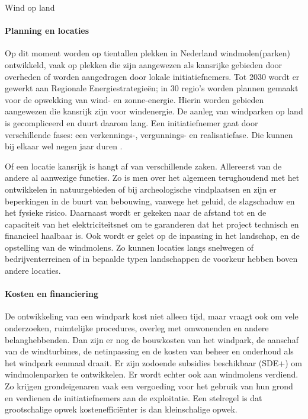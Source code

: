 \begin{voorstel}{Wind op land}
\begin{multicols}{2}
\begin{overwegingen}
\paragraph{Planning en locaties}
Op dit moment worden op tientallen plekken in Nederland windmolen(parken) ontwikkeld, vaak op plekken die zijn aangewezen als kansrijke gebieden door overheden of worden aangedragen door lokale initiatiefnemers. Tot 2030 wordt er gewerkt aan Regionale Energiestrategieën; in 30 regio’s worden plannen gemaakt voor de opwekking van wind- en zonne-energie. Hierin worden gebieden aangewezen die kansrijk zijn voor windenergie. De aanleg van windparken op land is gecompliceerd en duurt daarom lang. Een initiatiefnemer gaat door verschillende fases: een verkennings-, vergunnings- en realisatiefase. Die kunnen bij elkaar wel negen jaar duren \parencite{rijksdienst_voor_ondernemend_nederland_windenergie_nodate}.

Of een locatie kansrijk is hangt af van verschillende zaken. Allereerst van de andere al aanwezige functies. Zo is men over het algemeen terughoudend met het ontwikkelen in natuurgebieden of bij archeologische vindplaatsen en zijn er beperkingen in de buurt van bebouwing, vanwege het geluid, de slagschaduw en het fysieke risico. Daarnaast wordt er gekeken naar de afstand tot en de capaciteit van het elektriciteitsnet om te garanderen dat het project technisch en financieel haalbaar is. Ook wordt er gelet op de inpassing in het landschap, en de opstelling van de windmolens. Zo kunnen locaties langs snelwegen of bedrijventerreinen of in bepaalde typen landschappen de voorkeur hebben boven andere locaties.


\paragraph{Kosten en financiering}
De ontwikkeling van een windpark kost niet alleen tijd, maar vraagt ook om vele onderzoeken, ruimtelijke procedures, overleg met omwonenden en andere belanghebbenden. Dan zijn er nog de bouwkosten van het windpark, de aanschaf van de windturbines, de netinpassing en de kosten van beheer en onderhoud als het windpark eenmaal draait. Er zijn zodoende subsidies beschikbaar (SDE+) om windmolenparken te ontwikkelen. Er wordt echter ook aan windmolens verdiend. Zo krijgen grondeigenaren vaak een vergoeding voor het gebruik van hun grond en verdienen de initiatiefnemers aan de exploitatie. Een stelregel is dat grootschalige opwek kostenefficiënter is dan kleinschalige opwek.



\end{overwegingen}
\end{multicols}
\end{voorstel}
